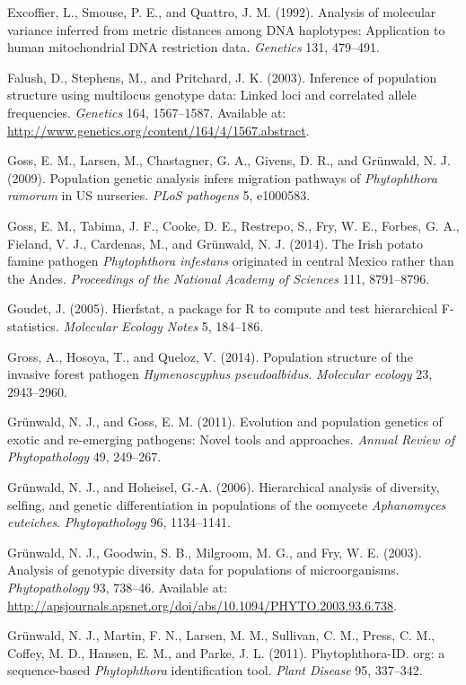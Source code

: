 \documentclass{frontiersSCNS} %
\begin{document}
Excoffier, L., Smouse, P. E., and Quattro, J. M. (1992). Analysis of
molecular variance inferred from metric distances among DNA haplotypes:
Application to human mitochondrial DNA restriction data. \emph{Genetics}
131, 479--491.

Falush, D., Stephens, M., and Pritchard, J. K. (2003). Inference of
population structure using multilocus genotype data: Linked loci and
correlated allele frequencies. \emph{Genetics} 164, 1567--1587.
Available at: \url{http://www.genetics.org/content/164/4/1567.abstract}.

Goss, E. M., Larsen, M., Chastagner, G. A., Givens, D. R., and
Gr{ü}nwald, N. J. (2009). Population genetic analysis infers migration
pathways of \emph{Phytophthora ramorum} in US nurseries. \emph{PLoS
pathogens} 5, e1000583.

Goss, E. M., Tabima, J. F., Cooke, D. E., Restrepo, S., Fry, W. E.,
Forbes, G. A., Fieland, V. J., Cardenas, M., and Gr{ü}nwald, N. J.
(2014). The Irish potato famine pathogen \emph{Phytophthora infestans}
originated in central Mexico rather than the Andes. \emph{Proceedings of
the National Academy of Sciences} 111, 8791--8796.

Goudet, J. (2005). Hierfstat, a package for R to compute and test
hierarchical F-statistics. \emph{Molecular Ecology Notes} 5, 184--186.

Gross, A., Hosoya, T., and Queloz, V. (2014). Population structure of
the invasive forest pathogen \emph{Hymenoscyphus pseudoalbidus}.
\emph{Molecular ecology} 23, 2943--2960.

Grünwald, N. J., and Goss, E. M. (2011). Evolution and population
genetics of exotic and re-emerging pathogens: Novel tools and
approaches. \emph{Annual Review of Phytopathology} 49, 249--267.

Gr{ü}nwald, N. J., and Hoheisel, G.-A. (2006). Hierarchical analysis of
diversity, selfing, and genetic differentiation in populations of the
oomycete \emph{Aphanomyces euteiches}. \emph{Phytopathology} 96,
1134--1141.

Grünwald, N. J., Goodwin, S. B., Milgroom, M. G., and Fry, W. E. (2003).
Analysis of genotypic diversity data for populations of microorganisms.
\emph{Phytopathology} 93, 738--46. Available at:
\url{http://apsjournals.apsnet.org/doi/abs/10.1094/PHYTO.2003.93.6.738}.

Gr{ü}nwald, N. J., Martin, F. N., Larsen, M. M., Sullivan, C. M., Press,
C. M., Coffey, M. D., Hansen, E. M., and Parke, J. L. (2011).
Phytophthora-ID. org: a sequence-based \emph{Phytophthora}
identification tool. \emph{Plant Disease} 95, 337--342.
\end{document}
